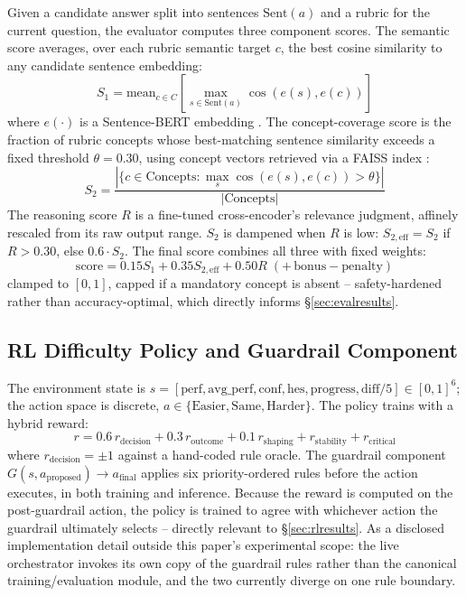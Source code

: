 \documentclass[conference]{IEEEtran}
\begin{document}
Given a candidate answer split into sentences $\mathrm{Sent}(a)$ and a rubric for the current question, the evaluator computes three component scores. The semantic score averages, over each rubric semantic target $c$, the best cosine similarity to any candidate sentence embedding:
\begin{equation}
S_1 = \mathrm{mean}_{c \in C} \left[ \max_{s \in \mathrm{Sent}(a)} \cos(e(s), e(c)) \right]
\end{equation}
where $e(\cdot)$ is a Sentence-BERT embedding \cite{reimers2019}. The concept-coverage score is the fraction of rubric concepts whose best-matching sentence similarity exceeds a fixed threshold $\theta = 0.30$, using concept vectors retrieved via a FAISS index \cite{johnson2019}:
\begin{equation}
S_2 = \frac{|\{c \in \mathrm{Concepts} : \max_{s} \cos(e(s), e(c)) > \theta\}|}{|\mathrm{Concepts}|}
\end{equation}
The reasoning score $R$ is a fine-tuned cross-encoder's relevance judgment, affinely rescaled from its raw output range. $S_2$ is dampened when $R$ is low: $S_{2,\mathrm{eff}} = S_2$ if $R > 0.30$, else $0.6 \cdot S_2$. The final score combines all three with fixed weights:
\begin{equation}
\mathrm{score} = 0.15 S_1 + 0.35 S_{2,\mathrm{eff}} + 0.50 R \;(+\,\mathrm{bonus} - \mathrm{penalty})
\end{equation}
clamped to $[0,1]$, capped if a mandatory concept is absent -- safety-hardened rather than accuracy-optimal, which directly informs \S\ref{sec:evalresults}.

\subsection{RL Difficulty Policy and Guardrail Component}
\label{sec:rl}

The environment state is $s = [\mathrm{perf}, \mathrm{avg\_perf}, \mathrm{conf}, \mathrm{hes}, \mathrm{progress}, \mathrm{diff}/5] \in [0,1]^6$; the action space is discrete, $a \in \{\mathrm{Easier}, \mathrm{Same}, \mathrm{Harder}\}$. The policy trains with a hybrid reward:
\begin{equation}
r = 0.6\,r_{\mathrm{decision}} + 0.3\,r_{\mathrm{outcome}} + 0.1\,r_{\mathrm{shaping}} + r_{\mathrm{stability}} + r_{\mathrm{critical}}
\end{equation}
where $r_{\mathrm{decision}} = \pm 1$ against a hand-coded rule oracle. The guardrail component $G(s, a_{\mathrm{proposed}}) \rightarrow a_{\mathrm{final}}$ applies six priority-ordered rules before the action executes, in both training and inference. Because the reward is computed on the post-guardrail action, the policy is trained to agree with whichever action the guardrail ultimately selects -- directly relevant to \S\ref{sec:rlresults}. As a disclosed implementation detail outside this paper's experimental scope: the live orchestrator invokes its own copy of the guardrail rules rather than the canonical training/evaluation module, and the two currently diverge on one rule boundary.
\end{document}
